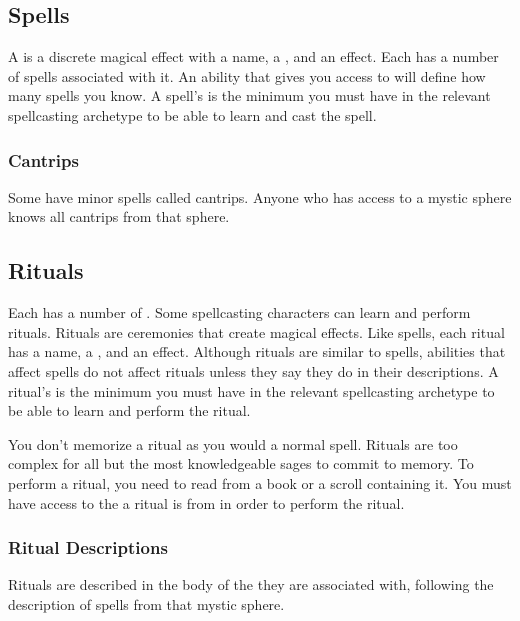     \subsection{Spells}\label{Spells}
        A  is a discrete magical effect with a name, a , and an effect.
        Each  has a number of spells associated with it.
        An ability that gives you access to  will define how many spells you know.
        A spell's  is the minimum  you must have in the relevant spellcasting archetype to be able to learn and cast the spell.

        \subsubsection{Cantrips}\label{Cantrips}
            Some  have minor spells called cantrips.
            Anyone who has access to a mystic sphere knows all cantrips from that sphere.

    \subsection{Rituals}\label{Rituals}
        Each  has a number of .
        Some spellcasting characters can learn and perform rituals.
        Rituals are ceremonies that create magical effects.
        Like spells, each ritual has a name, a , and an effect.
        Although rituals are similar to spells, abilities that affect spells do not affect rituals unless they say they do in their descriptions.
        A ritual's  is the minimum  you must have in the relevant spellcasting archetype to be able to learn and perform the ritual.

        You don't memorize a ritual as you would a normal spell.
        Rituals are too complex for all but the most knowledgeable sages to commit to memory.
        To perform a ritual, you need to read from a book or a scroll containing it.
        You must have access to the  a ritual is from in order to perform the ritual.

        \subsubsection{Ritual Descriptions}
            Rituals are described in the body of the  they are associated with, following the description of spells from that mystic sphere.

